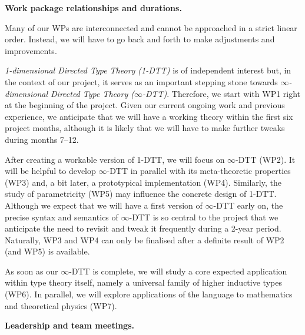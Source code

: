 \documentclass[a4paper,11pt]{article}
\newcommand{\solidbowtie}{\blacktriangleright\!\!\blacktriangleleft}
\newcommand{\deliv}{\textcolor{deliverable}{\raisebox{-.25em}{\DiamondSolid}}}
\renewcommand{\paragraph}[1]{\textbf{#1.}}
\begin{document}

\vspace*{0.1in}
\paragraph{Work package relationships and durations}

Many of our WPs are interconnected and cannot be approached in a strict linear order. Instead, we will have to go back and forth to make adjustments and improvements. %

\emph{1-dimensional Directed Type Theory (1-DTT)} is of independent interest but, in the context of our project, it serves as an important stepping stone towards \emph{$\infty$-dimensional Directed Type Theory ($\infty$-DTT)}.
Therefore, we start with WP1 right at the beginning of the project. Given our current ongoing work and previous experience, we anticipate that we will have a working theory within the first six project months, although it is likely that we will have to make further tweaks during months 7--12.

After creating a workable version of 1-DTT, we will focus on $\infty$-DTT (WP2). It will be helpful to develop $\infty$-DTT in parallel with its meta-theoretic properties (WP3) and, a bit later, a prototypical implementation (WP4).
Similarly, the study of parametricity (WP5) may influence the concrete design of 1-DTT.
Although we expect that we will have a first version of $\infty$-DTT early on,
the precise syntax and semantics of $\infty$-DTT is so central to the project that we anticipate the need to revisit and tweak it frequently during a 2-year period.
Naturally, WP3 and WP4 can only be finalised after a definite result of WP2 (and WP5) is available.

As soon as our $\infty$-DTT is complete, we will study a core expected application within type theory itself, namely a universal family of higher inductive types (WP6).
In parallel, we will explore applications of the language to mathematics and theoretical physics (WP7).

\paragraph{Leadership and team meetings}
\end{document}
